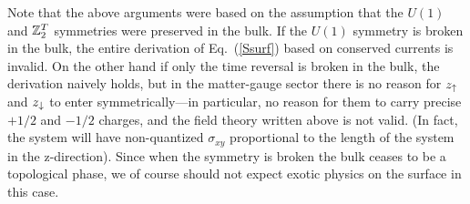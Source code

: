 Note that the above arguments were based on the assumption that the $U(1)$ and $\mathbb{Z}_2^T$ symmetries were preserved in the bulk. If the $U(1)$ symmetry is broken in the bulk, the entire derivation of Eq.~(\ref{Ssurf}) based on conserved currents is invalid.  On the other hand if only the time reversal is broken in the bulk, the derivation naively holds, but in the matter-gauge sector there is no reason for $z_{\uparrow}$ and $z_{\downarrow}$ to enter symmetrically---in particular, no reason for them to carry precise $+1/2$ and $-1/2$ charges, and the field theory written above is not valid. (In fact, the system will have non-quantized $\sigma_{xy}$ proportional to the length of the system in the z-direction). Since when the symmetry is broken the bulk ceases to be a topological phase, we of course should not expect exotic physics on the surface in this case.

